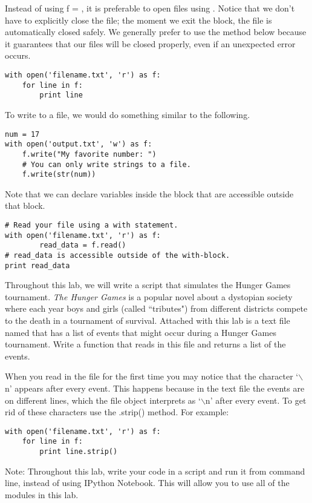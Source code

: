 Instead of using f = , it is preferable to open files using .
Notice that we don't have to explicitly close the file;
the moment we exit the  block, the file is automatically closed safely.
We generally prefer to use the method below because it guarantees that our files will be closed properly, even if an unexpected error occurs.
\begin{lstlisting}
with open('filename.txt', 'r') as f:
    for line in f:
        print line
\end{lstlisting}

To write to a file, we would do something similar to the following.
\begin{lstlisting}
num = 17
with open('output.txt', 'w') as f:
    f.write("My favorite number: ")
    # You can only write strings to a file.
    f.write(str(num))
\end{lstlisting}

Note that we can declare variables inside the  block that are accessible outside that block.
\begin{lstlisting}
# Read your file using a with statement.
with open('filename.txt', 'r') as f:
        read_data = f.read()
# read_data is accessible outside of the with-block.
print read_data
\end{lstlisting}

\begin{problem}
Throughout this lab, we will write a script that simulates the Hunger Games tournament. \emph{The Hunger Games} is a popular novel about a dystopian society where each year boys and girls (called ``tributes") from different districts compete to the death in a tournament of survival. Attached with this lab is a text file named  that has a list of events that might occur during a Hunger Games tournament. Write a function that reads in this file and returns a list of the events.

When you read in the file for the first time you may notice that the character `$\backslash$n' appears after every event. This happens because in the text file the events are on different lines, which the file object interprets as `$\backslash$n' after every event. To get rid of these characters use the .strip() method. For example:

\begin{lstlisting}
with open('filename.txt', 'r') as f:
    for line in f:
        print line.strip()
\end{lstlisting}

Note: Throughout this lab, write your code in a script and run it from command line, instead of using IPython Notebook. This will allow you to use all of the modules in this lab.

\end{problem}

